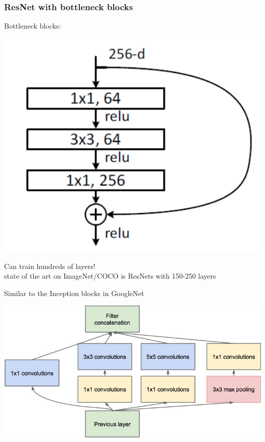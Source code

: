\documentclass[xcolor=dvipsnames]{beamer}
\begin{document}
\begin{frame}
  \frametitle{ResNet with bottleneck blocks}
   \begin{minipage}[c]{.75\linewidth}
  \bi
\item Bottleneck blocks:
\ei
  \end{minipage}%
  \begin{minipage}[c]{.25\linewidth}
      \includegraphics[width=.95\textwidth]{resnet-bottleneck-block}
  \end{minipage}
\bi
\item Can train hundreds of layers!\\
state of the art on ImageNet/COCO is ResNets with 150-250 layers
\item Similar to the Inception blocks in GoogleNet

\includegraphics[width=.5\textwidth]{inception-block}

\ei
\end{frame}
\end{document}
